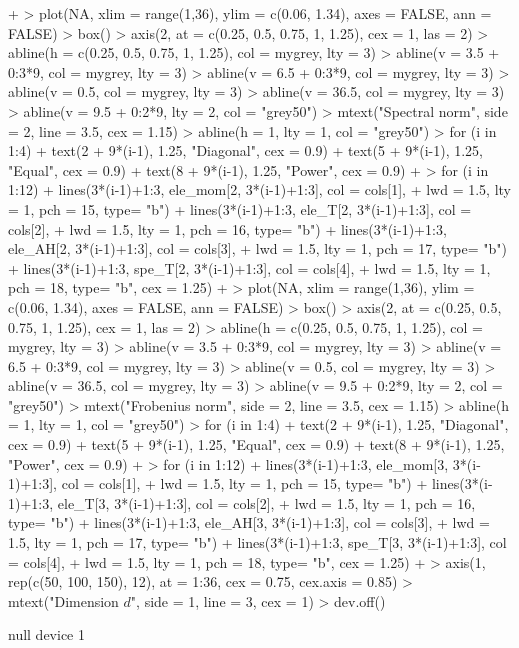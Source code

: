 \documentclass{article}
\begin{document}
\begin{Schunk}
\begin{Sinput}
{+ }
> plot(NA, xlim = range(1,36), ylim = c(0.06, 1.34), axes = FALSE, ann = FALSE)
> box()
> axis(2, at = c(0.25, 0.5, 0.75, 1, 1.25), cex = 1, las = 2)
> abline(h = c(0.25, 0.5, 0.75, 1, 1.25), col = mygrey, lty = 3)
> abline(v = 3.5 + 0:3*9, col = mygrey, lty = 3)
> abline(v = 6.5 + 0:3*9, col = mygrey, lty = 3)
> abline(v = 0.5, col = mygrey, lty = 3)
> abline(v = 36.5, col = mygrey, lty = 3)
> abline(v = 9.5 + 0:2*9, lty = 2, col = "grey50")
> mtext("Spectral norm", side = 2, line = 3.5, cex = 1.15)
> abline(h = 1, lty = 1, col = "grey50")
> for (i in 1:4){
+   text(2 + 9*(i-1), 1.25, "Diagonal", cex = 0.9)
+   text(5 + 9*(i-1), 1.25, "Equal", cex = 0.9)
+   text(8 + 9*(i-1), 1.25, "Power", cex = 0.9)
+ }
> for (i in 1:12){
+   lines(3*(i-1)+1:3, ele_mom[2, 3*(i-1)+1:3], col = cols[1],
+         lwd = 1.5, lty = 1, pch = 15, type= "b")
+   lines(3*(i-1)+1:3, ele_T[2, 3*(i-1)+1:3], col = cols[2],
+         lwd = 1.5, lty = 1, pch = 16, type= "b")
+   lines(3*(i-1)+1:3, ele_AH[2, 3*(i-1)+1:3], col = cols[3],
+         lwd = 1.5, lty = 1, pch = 17, type= "b")
+   lines(3*(i-1)+1:3, spe_T[2, 3*(i-1)+1:3], col = cols[4],
+         lwd = 1.5, lty = 1, pch = 18, type= "b", cex = 1.25)
+ }
> plot(NA, xlim = range(1,36), ylim = c(0.06, 1.34), axes = FALSE, ann = FALSE)
> box()
> axis(2, at = c(0.25, 0.5, 0.75, 1, 1.25), cex = 1, las = 2)
> abline(h = c(0.25, 0.5, 0.75, 1, 1.25), col = mygrey, lty = 3)
> abline(v = 3.5 + 0:3*9, col = mygrey, lty = 3)
> abline(v = 6.5 + 0:3*9, col = mygrey, lty = 3)
> abline(v = 0.5, col = mygrey, lty = 3)
> abline(v = 36.5, col = mygrey, lty = 3)
> abline(v = 9.5 + 0:2*9, lty = 2, col = "grey50")
> mtext("Frobenius norm", side = 2, line = 3.5, cex = 1.15)
> abline(h = 1, lty = 1, col = "grey50")
> for (i in 1:4){
+   text(2 + 9*(i-1), 1.25, "Diagonal", cex = 0.9)
+   text(5 + 9*(i-1), 1.25, "Equal", cex = 0.9)
+   text(8 + 9*(i-1), 1.25, "Power", cex = 0.9)
+ }
> for (i in 1:12){
+   lines(3*(i-1)+1:3, ele_mom[3, 3*(i-1)+1:3], col = cols[1],
+         lwd = 1.5, lty = 1, pch = 15, type= "b")
+   lines(3*(i-1)+1:3, ele_T[3, 3*(i-1)+1:3], col = cols[2],
+         lwd = 1.5, lty = 1, pch = 16, type= "b")
+   lines(3*(i-1)+1:3, ele_AH[3, 3*(i-1)+1:3], col = cols[3],
+         lwd = 1.5, lty = 1, pch = 17, type= "b")
+   lines(3*(i-1)+1:3, spe_T[3, 3*(i-1)+1:3], col = cols[4],
+         lwd = 1.5, lty = 1, pch = 18, type= "b", cex = 1.25)
+ }
> axis(1, rep(c(50, 100, 150), 12), at = 1:36, cex = 0.75, cex.axis = 0.85)
> mtext("Dimension $d$", side = 1, line = 3, cex = 1)
> dev.off()
\end{Sinput}
\begin{Soutput}
null device 
          1 
\end{Soutput}
\end{Schunk}

\begin{figure}

\end{figure}
\end{document}
